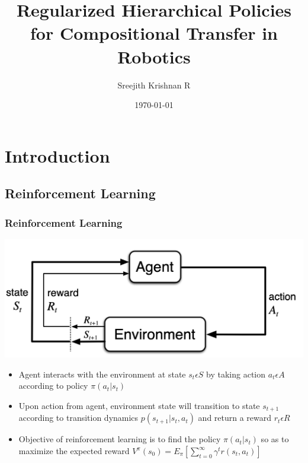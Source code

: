 \documentclass{beamer}
\title[HRL]{Regularized Hierarchical Policies for Compositional Transfer in Robotics}
\author{Sreejith Krishnan R}
\institute[CET]
{
College Of Engineering, Trivandrum \\ 
\medskip
\textit{Robotics \& Automation}
}
\date{\today}
\begin{document}
\begin{frame}
\titlepage 
\end{frame}

\section{Introduction} 

\subsection{Reinforcement Learning} 

\begin{frame}
\frametitle{Reinforcement Learning}
\begin{center}
	\includegraphics[scale=0.3]{mdp.png}
\end{center}

\begin{itemize}
	\item Agent interacts with the environment at state $s_t \epsilon S$ by taking action $a_t \epsilon A$ according to policy $\pi(a_t|s_t)$
	\item Upon action from agent, environment state will transition to state $s_{t+1}$ according to transition dynamics $p(s_{t+1}|s_t,a_t)$ and return a reward $r_t \epsilon R$
	\item Objective of reinforcement learning is to find the policy $\pi(a_t|s_t)$ so as to maximize the expected reward $V^{\pi}(s_0) = E_{\pi} [\sum_{t=0}^{\infty} \gamma^t r(s_t, a_t)]$
\end{itemize}
\end{frame}

\end{document}
